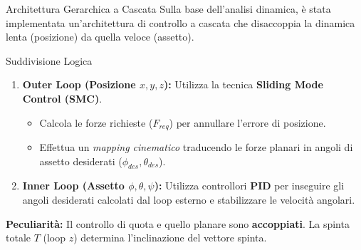 \documentclass[aspectratio=169]{beamer} %
\begin{document}
\begin{frame}{Architettura Gerarchica a Cascata}
    Sulla base dell'analisi dinamica, è stata implementata un'architettura di controllo a cascata che disaccoppia la dinamica lenta (posizione) da quella veloce (assetto).

    \begin{block}{Suddivisione Logica}
    \begin{enumerate}
        \item \textbf{Outer Loop (Posizione $x, y, z$):}
        Utilizza la tecnica \textbf{Sliding Mode Control (SMC)}.
        \begin{itemize}
            \item Calcola le forze richieste ($F_{req}$) per annullare l'errore di posizione.
            \item Effettua un \textit{mapping cinematico} traducendo le forze planari in angoli di assetto desiderati ($\phi_{des}, \theta_{des}$).
        \end{itemize}
        
        \item \textbf{Inner Loop (Assetto $\phi, \theta, \psi$):}
        Utilizza controllori \textbf{PID} per inseguire gli angoli desiderati calcolati dal loop esterno e stabilizzare le velocità angolari.
    \end{enumerate}
    \end{block}
    
    \vspace{0.2cm}
    \textbf{Peculiarità:} Il controllo di quota e quello planare sono \textbf{accoppiati}. La spinta totale $T$ (loop $z$) determina l'inclinazione del vettore spinta.
\end{frame}
\end{document}
